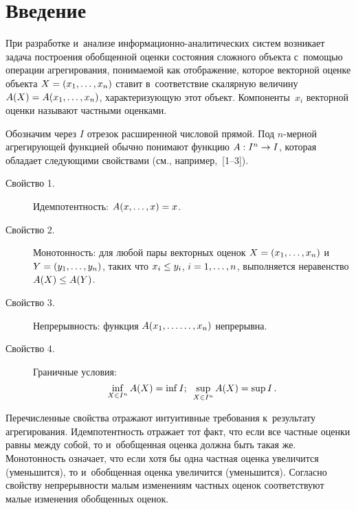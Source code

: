 \begin{multicols}{2}

\label{st\stat}

\section{Введение}

При разработке и~анализе  информационно-ана\-ли\-ти\-че\-ских сис\-тем возникает задача 
по\-стро\-ения обобщенной оценки состояния сложного объекта с~по\-мощью операции 
агрегирования,  понимаемой как отображение, которое векторной оценке 
объекта $X \hm= (x_1,\ldots, x_n)$ ставит в~соответствие скалярную величину  $A(X) \hm= 
A(x_1,\ldots, x_n)$,  характеризующую этот объект. Компоненты~$x_i$ векторной 
оценки называют частными оценками.

Обозначим через $I$ отрезок расширенной чис\-ло\-вой прямой. Под $n$-мер\-ной 
агрегирующей функцией обычно понимают функцию $A: I^n\hm\rightarrow I$, \mbox{которая} 
обладает следующими свойствами (см., например,~[1--3]).

\begin{description}
\item[Свойство 1.] Идемпотентность: $A(x, \ldots, x) \hm= x$.

\item[Свойство 2.] Монотонность: для любой пары векторных оценок $X \hm= (x_1,\ldots, x_n)$ 
и~$Y \hm= (y_1,\ldots , y_n)$, таких что $x_i\hm\leq y_i$, $i\hm=1,\ldots ,n$, выполняется 
неравенство $A(X)\hm\leq A(Y)$.

\item[Свойство 3.] Непрерывность: функция $A(x_1,\ldots\linebreak \ldots, x_n)$ непрерывна.

\item[Свойство 4.] Граничные условия: 
$$
\inf\limits_{X\in I^n}A(X) = \inf I;\enskip 
\sup\limits_{X\in I^n}A(X)= \sup I\,.
$$
\end{description}


Перечисленные свойства отражают интуитивные требования к~результату 
агрегирования. Идемпотентность  отражает тот факт, что если все частные оценки 
равны между собой, то и~обобщенная оценка должна быть такая же. Монотонность 
означает, что если хотя бы одна частная оценка увеличится (уменьшится), то 
и~обобщенная оценка увеличится (уменьшится). Согласно свойству непрерывности  
малым изменениям частных оценок соответствуют малые изменения обобщенных оценок.


\end{multicols}
